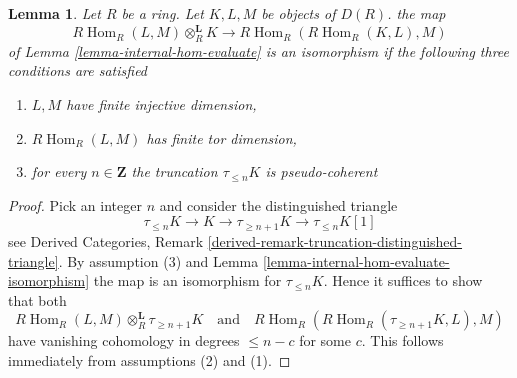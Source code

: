 \documentclass[10pt,a4paper]{amsart}
\theoremstyle{plain}
\newtheorem{lemma}[subsection]{Lemma}
\theoremstyle{definition}
\theoremstyle{remark}
\numberwithin{equation}{subsection}
\def\Hom{\mathop{\mathrm{Hom}}\nolimits}
\begin{document}
\begin{lemma}
\label{lemma-internal-hom-evaluate-isomorphism-technical}
Let $R$ be a ring. Let $K, L, M$ be objects of $D(R)$.
the map
$$
R\Hom_R(L, M) \otimes_R^\mathbf{L} K \longrightarrow R\Hom_R(R\Hom_R(K, L), M)
$$
of Lemma \ref{lemma-internal-hom-evaluate} is an isomorphism
if the following three conditions are satisfied
\begin{enumerate}
\item $L, M$ have finite injective dimension,
\item $R\Hom_R(L, M)$ has finite tor dimension,
\item for every $n \in \mathbf{Z}$ the truncation $\tau_{\leq n}K$
is pseudo-coherent
\end{enumerate}
\end{lemma}

\begin{proof}
Pick an integer $n$ and consider the distinguished triangle
$$
\tau_{\leq n}K \to K \to \tau_{\geq n + 1}K \to \tau_{\leq n}K[1]
$$
see Derived Categories, Remark
\ref{derived-remark-truncation-distinguished-triangle}.
By assumption (3) and Lemma \ref{lemma-internal-hom-evaluate-isomorphism}
the map is an isomorphism for $\tau_{\leq n}K$. Hence it
suffices to show that both
$$
R\Hom_R(L, M) \otimes_R^\mathbf{L} \tau_{\geq n + 1}K
\quad\text{and}\quad
R\Hom_R(R\Hom_R(\tau_{\geq n + 1}K, L), M)
$$
have vanishing cohomology in degrees $\leq n - c$ for some $c$.
This follows immediately from assumptions (2) and (1).
\end{proof}
\end{document}

